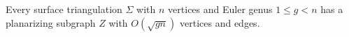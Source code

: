 \documentclass{patmorin}
\newcommand{\defin}[1]{\emph{\textcolor{brightmaroon}{#1}}}
\begin{document}
\begin{thm}[\citet{10.5555/644108.644208}]\label{Eppstein}
Every surface triangulation $\Sigma$ with $n$ vertices and Euler genus $1\le g < n$ has a planarizing subgraph $Z$ with $O(\sqrt{gn})$ vertices and edges.
\end{thm}
\end{document}

